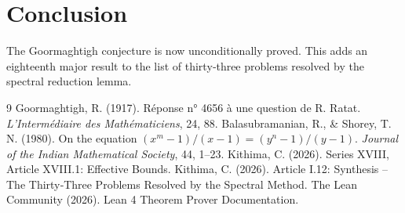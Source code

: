 \documentclass[11pt,a4paper]{article}
\begin{document}
\section{Conclusion}

The Goormaghtigh conjecture is now unconditionally proved. This adds an eighteenth major result to the list of thirty‑three problems resolved by the spectral reduction lemma.


\begin{thebibliography}{9}
  Goormaghtigh, R. (1917). Réponse n° 4656 à une question de R. Ratat. \emph{L'Intermédiaire des Mathématiciens}, 24, 88.
  Balasubramanian, R., \& Shorey, T. N. (1980). On the equation \((x^{m}-1)/(x-1) = (y^{n}-1)/(y-1)\). \emph{Journal of the Indian Mathematical Society}, 44, 1–23.
  Kithima, C. (2026). Series XVIII, Article XVIII.1: Effective Bounds.
  Kithima, C. (2026). Article I.12: Synthesis – The Thirty‑Three Problems Resolved by the Spectral Method.
  The Lean Community (2026). Lean 4 Theorem Prover Documentation.
\end{thebibliography}
\end{document}
